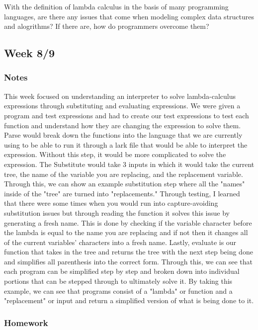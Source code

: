 \documentclass{article}
\theoremstyle{theorem}
\theoremstyle{definition}
\theoremstyle{remark}
\begin{document}
With the definition of lambda calculus in the basis of many programming languages, are there any issues that come when modeling complex data structures and alogrithms? If there are, how do programmers overcome them?

\subsection{Week 8/9}

\subsubsection{Notes}

This week focused on understanding an interpreter to solve lambda-calculus 
expressions through substituting and evaluating expressions. We were given a 
program and test expressions and had to create our test expressions to test 
each function and understand how they are changing the expression to solve them. 
Parse would break down the functions into the language that we are currently 
using to be able to run it through a lark file that would be able to 
interpret the expression. Without this step, it would be more complicated 
to solve the expression. The Substitute would take 3 inputs in which it 
would take the current tree, the name of the variable you are replacing, 
and the replacement variable. Through this, we can show an example substitution 
step where all the "names" inside of the "tree" are turned into "replacements." 
Through testing, I learned that there were some times when you would run into 
capture-avoiding substitution issues but through reading the function it solves 
this issue by generating a fresh name. This is done by checking if the variable 
character before the lambda is equal to the name you are replacing and if not 
then it changes all of the current variables' characters into a fresh name. Lastly, 
evaluate is our function that takes in the tree and returns the tree with the next 
step being done and simplifies all parenthesis into the correct form. Through this, 
we can see that each program can be simplified step by step and broken down into 
individual portions that can be stepped through to ultimately solve it. By taking 
this example, we can see that programs consist of a "lambda" or function and a 
"replacement" or input and return a simplified version of what is being done to it.

\subsubsection{Homework}
\end{document}
